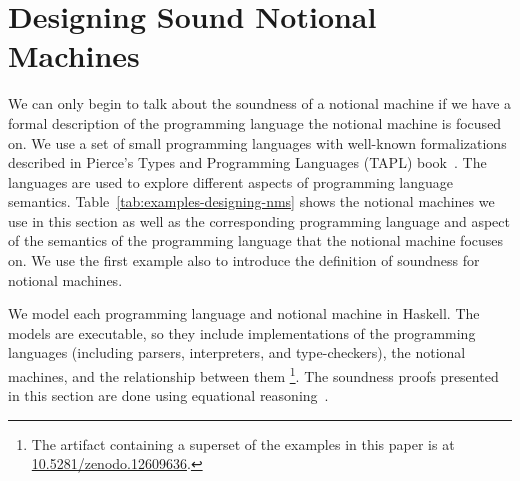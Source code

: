 \section{Designing Sound Notional Machines}
\label{chr:Modeling}


We can only begin to talk about the soundness of a notional machine if we have a
formal description of the programming language the notional machine is focused
on.
%
We use a set of small programming languages with well-known formalizations
described in
Pierce's Types and Programming Languages (TAPL) book~\citep{pierceTypesProgrammingLanguages2002}.
The languages are used to
explore different aspects of programming language semantics.
%
%
Table~\ref{tab:examples-designing-nms}
shows
the notional machines
we use in this section
as well as
the corresponding programming language
and aspect of the semantics of the programming language
that the notional machine focuses on.
%
We use the first example also to introduce the definition of soundness for notional machines.

We model each programming language and notional machine in Haskell.
The models are executable,
so they include implementations of the programming languages
(including parsers, interpreters, and type-checkers),
the notional machines,
and the relationship between them%
\footnote{%
The artifact containing a superset of the examples in this paper
is at
\href{https://zenodo.org/doi/10.5281/zenodo.12609636}{10.5281/zenodo.12609636}.
}.
The soundness proofs presented in this section are done using equational reasoning~\citep{gibbonsCalculatingFunctionalPrograms2002,birdAlgebraicIdentitiesProgram1989}.

